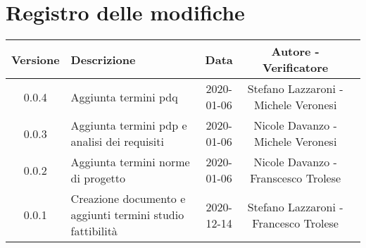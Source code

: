 \section*{Registro delle modifiche}

\begin{center}
	\begin{longtable}{|c|p{5cm}|c|c|c|}
	\hline
	\rowcolor{lighter-grayer}
	\textbf{Versione} & \textbf{Descrizione} & \textbf{Data} & \textbf{Autore - Verificatore} \\
	\hline
	\endfirsthead


	\hline
	0.0.4 & Aggiunta termini pdq& 2020-01-06 & Stefano Lazzaroni - Michele Veronesi\\
	0.0.3 & Aggiunta termini pdp e analisi dei requisiti & 2020-01-06 & Nicole Davanzo - Michele Veronesi\\
	0.0.2 & Aggiunta termini norme di progetto & 2020-01-06 & Nicole Davanzo -  Franscesco Trolese\\
	0.0.1 & Creazione documento e aggiunti termini studio fattibilità & 2020-12-14 & Stefano Lazzaroni - Francesco Trolese\\
	\hline

	\end{longtable}
\end{center}